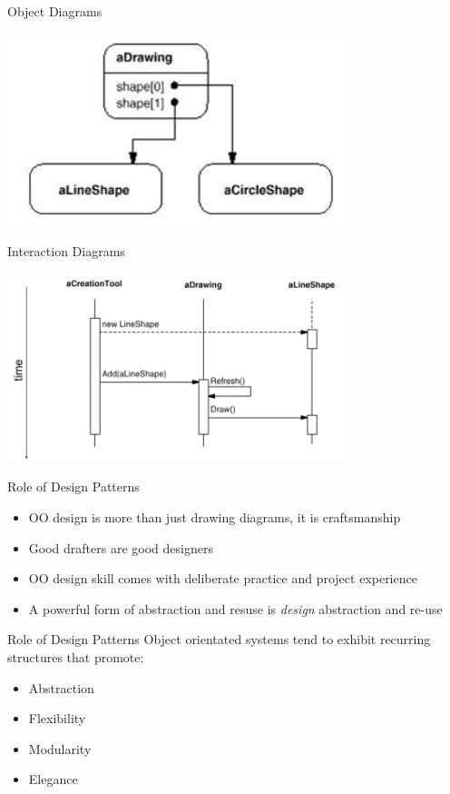\begin{frame}{Object Diagrams}
	\begin{center}
		\includegraphics[width=10cm]{object_diagram.jpg}
	\end{center}
\end{frame}

\begin{frame}{Interaction Diagrams}
	\begin{center}
		\includegraphics[width=10cm]{interaction_diagram.jpg}
	\end{center}
\end{frame}

\begin{frame}{Role of Design Patterns}
	\begin{itemize}
		\item OO design is more than just drawing diagrams, it is craftsmanship
		\item Good drafters are good designers
		\item OO design skill comes with deliberate practice and project experience
		\item A powerful form of abstraction and resuse is \textit{design} abstraction and re-use
	\end{itemize}
\end{frame}

\begin{frame}{Role of Design Patterns}
Object orientated systems tend to exhibit recurring structures that promote:

	\begin{itemize}
		\item Abstraction
		\item Flexibility
		\item Modularity
		\item Elegance
	\end{itemize}
\end{frame}

